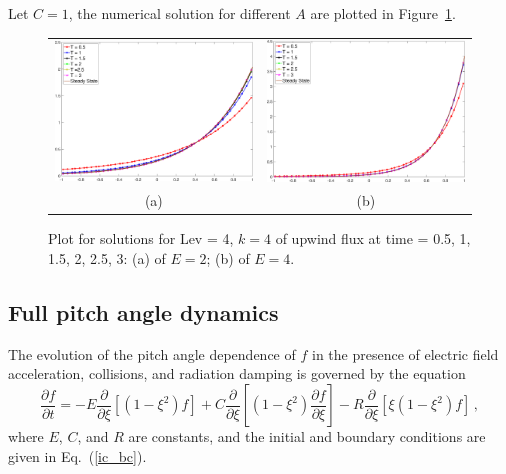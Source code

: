 \documentclass[preprint,11pt]{elsarticle}
\newcommand{\bq}{\begin{equation}}
\newcommand{\eq}{\end{equation}}
\begin{document}
Let $C = 1$, the numerical solution for different $A$ are plotted in Figure~\ref{fig:pitch_E_coll}.

\begin{figure}[H]
\centering
\begin{tabular}{cc}
  \includegraphics[width=.45\textwidth]{./NumFig/condiff-uf-E2_v2}
  &\includegraphics[width=.45\textwidth]{./NumFig/condiff-uf-E4_v2}\\
  (a) & (b)
  \end{tabular}
\caption{Plot for solutions for Lev = 4, $k = 4$ of upwind flux at time = 0.5, 1, 1.5, 2, 2.5, 3: (a) of $E=2$; (b) of $E = 4$.}\label{fig:pitch_E_coll}
\end{figure}



\subsection{Full pitch angle dynamics}\label{SubSect:Pitch-5}
The evolution of the pitch angle dependence of $f$ in the presence of electric field acceleration, collisions, and radiation damping is governed by the equation
\bq
\label{pitch_full_eq}
\frac{\partial f}{\partial t}= 
- E \frac{\partial}{\partial\xi} \left[ \left(1-\xi^2\right) f \right] + C \frac{\partial}{\partial\xi} \left[ \left(1-\xi^2\right) \frac{\partial f}{\partial \xi} \right] - R \frac{\partial}{\partial\xi} \left[\xi \left(1-\xi^2\right) f\right]  \, ,
\eq
where $E$, $C$, and $R$ are constants, and the initial and boundary conditions are given in Eq.~(\ref{ic_bc}). 
\end{document}
